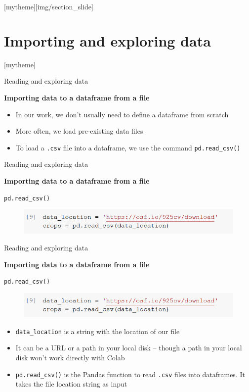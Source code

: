 \documentclass[aspectratio=169]{beamer}
\newcommand{\sectionpic}[2]{
	\setbeamertemplate{section page}[mytheme][#2]
	\section{#1}
	\setbeamertemplate{section page}[mytheme]
}
\begin{document}
\sectionpic{Importing and exploring data}{img/section_slide}


\begin{frame}{Reading and exploring data}

	\textbf{Importing data to a dataframe from a file}

	\begin{itemize}
		\item In our work, we don't usually need to define a dataframe from scratch
		\item More often, we load pre-existing data files
		\item To load a \texttt{.csv} file into a dataframe, we use the command \texttt{pd.read\_csv()}
	\end{itemize}

\end{frame}

\begin{frame}{Reading and exploring data}

	\textbf{Importing data to a dataframe from a file}

	\texttt{pd.read\_csv()}

	\begin{figure}
		\centering
		\includegraphics[width=0.9\linewidth]{img/read_csv.png}
	\end{figure}

\end{frame}

\begin{frame}{Reading and exploring data}

	\textbf{Importing data to a dataframe from a file}

	\texttt{pd.read\_csv()}

	\begin{figure}
		\centering
		\includegraphics[width=0.9\linewidth]{img/read_csv.png}
	\end{figure}
	\begin{itemize}
		\item \texttt{data\_location} is a string with the location of our file
		\item It can be a URL or a path in your local disk -- though a path in your local disk won't work directly with Colab
		\item \texttt{pd.read\_csv()} is the Pandas function to read \texttt{.csv} files into dataframes. It takes the file location string as input
	\end{itemize}

\end{frame}
\end{document}
